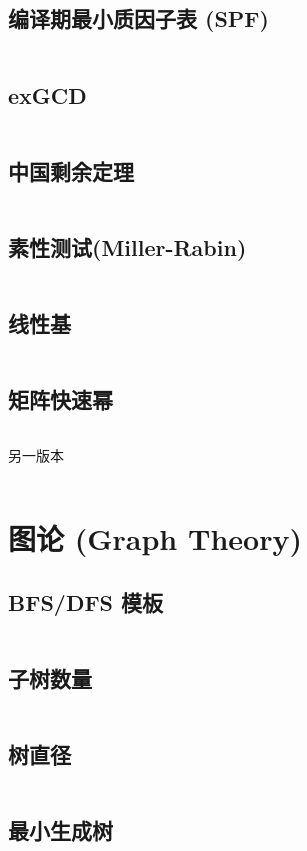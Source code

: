 \documentclass[openany,a4paper]{book}
\begin{document}
\section{编译期最小质因子表 (SPF)}
\inputminted{cpp}{NumberTheory/SPF.hpp}

\section{exGCD}
\inputminted{cpp}{NumberTheory/exgcd.h}

\section{中国剩余定理}
\inputminted{cpp}{NumberTheory/CRT.h}

\section{素性测试(Miller-Rabin)}
\inputminted{cpp}{NumberTheory/isPrime.cpp}

\section{线性基}
\inputminted{cpp}{Linear/basis.cpp}
\section{矩阵快速幂}
\inputminted{cpp}{Linear/qpow.cpp}
另一版本
\inputminted{cpp}{NumberTheory/matQpow.hpp}

\chapter{图论 (Graph Theory)}%
\section{BFS/DFS 模板}
\inputminted{cpp}{GraphTheory/bfs_dfs_template.hpp}
\section{子树数量}
\inputminted{cpp}{GraphTheory/childtree.cpp}
\section{树直径}
\inputminted{cpp}{GraphTheory/tree_diameter.hpp}
\section{最小生成树}
\inputminted{cpp}{GraphTheory/mst.h}
\end{document}
